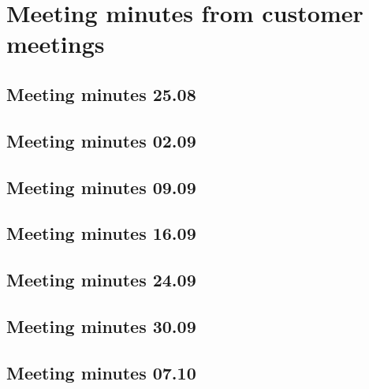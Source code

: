 \chapter{Meeting minutes from customer meetings}
\label{app:customer-minutes}

\section{Meeting minutes 25.08}
\label{app:customer-minutes-1}


\section{Meeting minutes 02.09}
\label{app:customer-minutes-2}


\section{Meeting minutes 09.09}
\label{app:customer-minutes-3}


\section{Meeting minutes 16.09}
\label{app:customer-minutes-4}


\section{Meeting minutes 24.09}
\label{app:customer-minutes-5}


\section{Meeting minutes 30.09}
\label{app:customer-minutes-6}


\section{Meeting minutes 07.10}
\label{app:customer-minutes-7}


